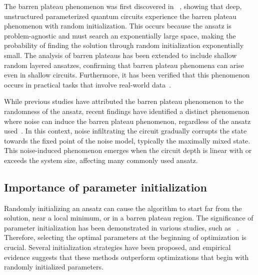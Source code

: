 \documentclass[12pt,dvipdfmx,twoside,openright]{report}
\begin{document}
The barren plateau phenomenon was first discovered in ~\cite{barrenplateau1}, showing that deep, unstructured parameterized quantum circuits experience the barren plateau phenomenon with random initialization.
This occurs because the ansatz is problem-agnostic and must search an exponentially large space, making the probability of finding the solution through random initialization exponentially small.
The analysis of barren plateaus has been extended to include shallow random layered ansatzes, confirming that barren plateau phenomena can arise even in shallow circuits.
Furthermore, it has been verified that this phenomenon occurs in practical tasks that involve real-world data~\cite{barren-generic0,barren-generic1,barren-generic2}.

While previous studies have attributed the barren plateau phenomenon to the randomness of the ansatz, recent findings have identified a distinct phenomenon where noise can induce the barren plateau phenomenon, regardless of the ansatz used~\cite{barren-noise}.
In this context, noise infiltrating the circuit gradually corrupts the state towards the fixed point of the noise model, typically the maximally mixed state.
This noise-induced phenomenon emerges when the circuit depth is linear with or exceeds the system size, affecting many commonly used ansatz.


\subsection{Importance of parameter initialization}
Randomly initializing an ansatz can cause the algorithm to start far from the solution, near a local minimum, or in a barren plateau region.
The significance of parameter initialization has been demonstrated in various studies, such as ~\cite{qaoa2}.
Therefore, selecting the optimal parameters at the beginning of optimization is crucial.
Several initialization strategies have been proposed, and empirical evidence suggests that these methods outperform optimizations that begin with randomly initialized parameters.
\end{document}
